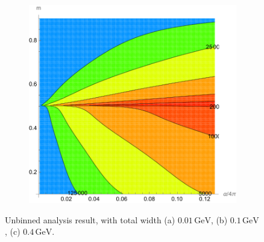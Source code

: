 \documentclass[10pt]{article}
\theoremstyle{definition}
\theoremstyle{remark}
\begin{document}
\begin{figure}[h]
\begin{subfigure}{0.3\textwidth}
			\caption{}
		\end{subfigure}
		\begin{subfigure}{0.3\textwidth}
			\centering
			\includegraphics[width=\textwidth]{unbinned_0.4GeV.pdf}
			\caption{}
		\end{subfigure}
		\caption{Unbinned analysis result, with total width (a) $0.01\,\mathrm{GeV}$, (b) $0.1\,\mathrm{GeV}$, (c) $0.4\,\mathrm{GeV}$.}
		\label{fig:unbinned}
	\end{figure}
	
	
	
\end{document}

